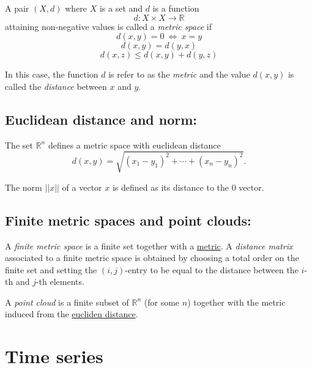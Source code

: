 \documentclass{amsart}
\begin{document}
	A  pair $(X, d)$ where $X$ is a set and $d$ is a function 
	\begin{equation*}
	d : X \times X \to \mathbb R
	\end{equation*}
	attaining non-negative values is called a \textit{metric space} if
  \begin{equation*}
	d(x,y) = 0\ \Leftrightarrow\  x = y
  \end{equation*}
	\begin{equation*}
  d(x,y) = d(y,x)
  \end{equation*}
	\begin{equation*}
  d(x,z) \leq d(x,y) + d(y, z)
  \end{equation*}
	
	In this case, the function $d$ is refer to as the \textit{metric} and the value $d(x,y)$ is called the \textit{distance} between $x$ and $y$. 
	
	\subsection*{Euclidean distance and norm:} \label{euclidean distance and norm}
	
	The set $\mathbb R^n$ defines a metric space with euclidean distance
	\begin{equation*}
	d(x,y) = \sqrt{(x_1-y_1)^2 + \cdots + (x_n-y_n)^2}.
	\end{equation*}
	
	The norm $||x||$ of a vector $x$ is defined as its distance to the $0$ vector.
	
	\subsection*{Finite metric spaces and point clouds:} \label{finite metric spaces and point clouds}
	
	A \textit{finite metric space} is a finite set together with a \hyperref[metric space]{metric}. A \textit{distance matrix} associated to a finite metric space is obtained by choosing a total order on the finite set and setting the $(i,j)$-entry to be equal to the distance between the $i$-th and $j$-th elements. 
	
	A \textit{point cloud} is a finite subset of $\mathbb{R}^n$ (for some $n$) together with the metric induced from the \hyperref[euclidean distance and norm]{eucliden distance}.
	
	\section{Time series}
	
\end{document}
